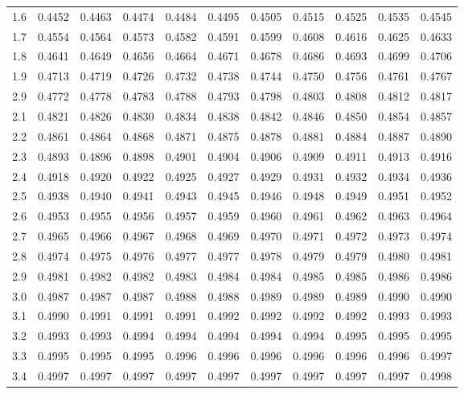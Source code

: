 \begin{table}[ht]
\begin{tabular}{r||rrrrrrrrrr}
  1.6 & 0.4452 & 0.4463 & 0.4474 & 0.4484 & 0.4495 & 0.4505 & 0.4515 & 0.4525 & 0.4535 & 0.4545 \\ 
  1.7 & 0.4554 & 0.4564 & 0.4573 & 0.4582 & 0.4591 & 0.4599 & 0.4608 & 0.4616 & 0.4625 & 0.4633 \\ 
  1.8 & 0.4641 & 0.4649 & 0.4656 & 0.4664 & 0.4671 & 0.4678 & 0.4686 & 0.4693 & 0.4699 & 0.4706 \\ 
  1.9 & 0.4713 & 0.4719 & 0.4726 & 0.4732 & 0.4738 & 0.4744 & 0.4750 & 0.4756 & 0.4761 & 0.4767 \\ 
  2.9 & 0.4772 & 0.4778 & 0.4783 & 0.4788 & 0.4793 & 0.4798 & 0.4803 & 0.4808 & 0.4812 & 0.4817 \\ 
  2.1 & 0.4821 & 0.4826 & 0.4830 & 0.4834 & 0.4838 & 0.4842 & 0.4846 & 0.4850 & 0.4854 & 0.4857 \\ 
  2.2 & 0.4861 & 0.4864 & 0.4868 & 0.4871 & 0.4875 & 0.4878 & 0.4881 & 0.4884 & 0.4887 & 0.4890 \\ 
  2.3 & 0.4893 & 0.4896 & 0.4898 & 0.4901 & 0.4904 & 0.4906 & 0.4909 & 0.4911 & 0.4913 & 0.4916 \\ 
  2.4 & 0.4918 & 0.4920 & 0.4922 & 0.4925 & 0.4927 & 0.4929 & 0.4931 & 0.4932 & 0.4934 & 0.4936 \\ 
  2.5 & 0.4938 & 0.4940 & 0.4941 & 0.4943 & 0.4945 & 0.4946 & 0.4948 & 0.4949 & 0.4951 & 0.4952 \\ 
  2.6 & 0.4953 & 0.4955 & 0.4956 & 0.4957 & 0.4959 & 0.4960 & 0.4961 & 0.4962 & 0.4963 & 0.4964 \\ 
  2.7 & 0.4965 & 0.4966 & 0.4967 & 0.4968 & 0.4969 & 0.4970 & 0.4971 & 0.4972 & 0.4973 & 0.4974 \\ 
  2.8 & 0.4974 & 0.4975 & 0.4976 & 0.4977 & 0.4977 & 0.4978 & 0.4979 & 0.4979 & 0.4980 & 0.4981 \\ 
  2.9 & 0.4981 & 0.4982 & 0.4982 & 0.4983 & 0.4984 & 0.4984 & 0.4985 & 0.4985 & 0.4986 & 0.4986 \\ 
  3.0 & 0.4987 & 0.4987 & 0.4987 & 0.4988 & 0.4988 & 0.4989 & 0.4989 & 0.4989 & 0.4990 & 0.4990 \\ 
  3.1 & 0.4990 & 0.4991 & 0.4991 & 0.4991 & 0.4992 & 0.4992 & 0.4992 & 0.4992 & 0.4993 & 0.4993 \\ 
  3.2 & 0.4993 & 0.4993 & 0.4994 & 0.4994 & 0.4994 & 0.4994 & 0.4994 & 0.4995 & 0.4995 & 0.4995 \\ 
  3.3 & 0.4995 & 0.4995 & 0.4995 & 0.4996 & 0.4996 & 0.4996 & 0.4996 & 0.4996 & 0.4996 & 0.4997 \\ 
  3.4 & 0.4997 & 0.4997 & 0.4997 & 0.4997 & 0.4997 & 0.4997 & 0.4997 & 0.4997 & 0.4997 & 0.4998 \\
   \hline
\end{tabular}
\end{table}

